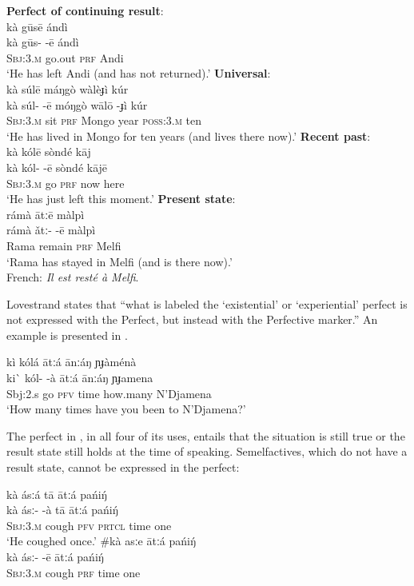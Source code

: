 \ea \label{ex:22.25}
\ea  \textbf{Perfect of continuing result}:\\
\glll kà  gūsē  {}  ándì\\
kà  gūs-  -ē  ándì\\
\textsc{Sbj:3.m}  go.out  \textsc{prf}  Andi\\
\glt ‘He has left Andi (and has not returned).’
\ex   \textbf{Universal}:\\
\glll kà  súlē  {}  máŋgò  wàlèɟì  {}  kúr\\
kà  súl-  -ē  móŋgò  wālō  -ɟì   kúr\\
\textsc{Sbj:3.m}  sit  \textsc{prf}  Mongo  year  \textsc{poss:3.m}  ten\\
\glt ‘He has lived in Mongo for ten years (and lives there now).’
\ex   \textbf{Recent past}:\\
\glll kà  kólē  {}  sòndé  kāj\\
kà  kól-  -ē  sòndé  kājē\\
\textsc{Sbj:3.m}  go  \textsc{prf}  now  here\\
\glt ‘He has just left this moment.’
\ex   \textbf{Present state}:\\
\glll rámà  ātːē  {}  màlpì\\
rámà  ǎtː-  -ē  màlpì\\
Rama  remain  \textsc{prf}  Melfi\\
\glt ‘Rama has stayed in Melfi (and is there now).’\\
{French}: \textit{Il est resté à Melfi}.
\z \z


Lovestrand states that “what is labeled the ‘existential’ or ‘experiential’ perfect is not expressed with the Perfect, but instead with the Perfective marker.” An example is presented in .


\ea \label{ex:22.26}
\glll kì  kólá  {}  ātːá  ānːáŋ  ɲɟàménà\\
ki\`{}   kól-  -à  ātːá  ānːáŋ  ɲɟamena\\
Sbj:2.s  go  \textsc{pfv}  time  how.many  N’Djamena\\
\glt ‘How many times have you been to N’Djamena?’
\z


The perfect in , in all four of its uses, entails that the situation is still true or the result state still holds at the time of speaking. Semelfactives, which do not have a result state, cannot be expressed in the perfect:


\ea \label{ex:22.27}
\ea \glll  kà  ásːá  {}  tā  ātːá  pańiŋ́ \\
kà  ásː-  -à  tā  ātːá  pańiŋ́ \\
\textsc{Sbj:3.m}  cough  \textsc{pfv}  \textsc{prtcl}  time  one\\
\glt ‘He coughed once.’
\ex \glll  \#kà  asːe  {}  ātːá  pańiŋ́ \\ 
  kà  ásː-  -ē  ātːá  pańiŋ́ \\
\textsc{Sbj:3.m}  cough  \textsc{prf}  time  one\\
\z \z


